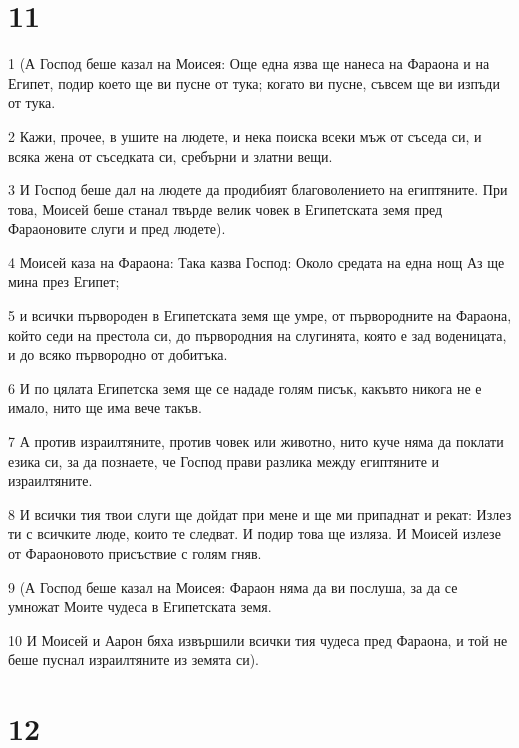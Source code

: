 \chapter{11}

\par 1 (А Господ беше казал на Моисея: Още една язва ще нанеса на Фараона и на Египет, подир което ще ви пусне от тука; когато ви пусне, съвсем ще ви изпъди от тука.
\par 2 Кажи, прочее, в ушите на людете, и нека поиска всеки мъж от съседа си, и всяка жена от съседката си, сребърни и златни вещи.
\par 3 И Господ беше дал на людете да продибият благоволението на египтяните. При това, Моисей беше станал твърде велик човек в Египетската земя пред Фараоновите слуги и пред людете).
\par 4 Моисей каза на Фараона: Така казва Господ: Около средата на една нощ Аз ще мина през Египет;
\par 5 и всички първороден в Египетската земя ще умре, от първородните на Фараона, който седи на престола си, до първородния на слугинята, която е зад воденицата, и до всяко първородно от добитъка.
\par 6 И по цялата Египетска земя ще се нададе голям писък, какъвто никога не е имало, нито ще има вече такъв.
\par 7 А против израилтяните, против човек или животно, нито куче няма да поклати езика си, за да познаете, че Господ прави разлика между египтяните и израилтяните.
\par 8 И всички тия твои слуги ще дойдат при мене и ще ми припаднат и рекат: Излез ти с всичките люде, които те следват. И подир това ще изляза. И Моисей излезе от Фараоновото присъствие с голям гняв.
\par 9 (А Господ беше казал на Моисея: Фараон няма да ви послуша, за да се умножат Моите чудеса в Египетската земя.
\par 10 И Моисей и Аарон бяха извършили всички тия чудеса пред Фараона, и той не беше пуснал израилтяните из земята си).

\chapter{12}

